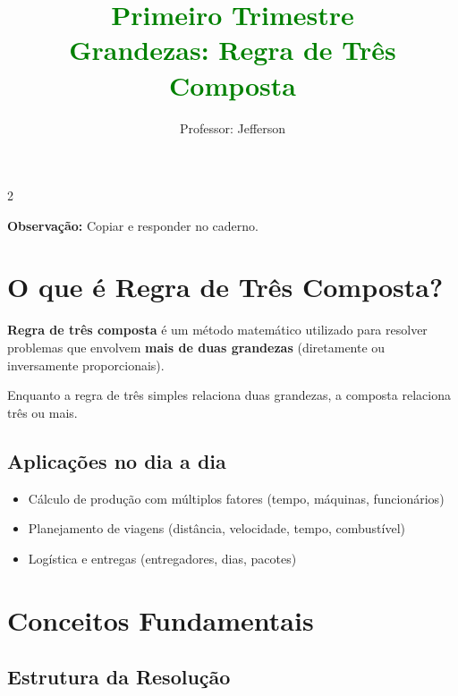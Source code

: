 \documentclass[11pt]{article}
\title{\textcolor{green}{Primeiro Trimestre \\
    Grandezas: Regra de Três Composta}}
\author{Professor: Jefferson}
\date{}
\begin{document}
\maketitle
\vspace{-1cm}

\begin{multicols}{2}
\begin{center}
    \textbf{Observação:} Copiar e responder no caderno.
\end{center}
    
\section*{O que é Regra de Três Composta?}

\textbf{Regra de três composta} é um método matemático utilizado para resolver problemas que envolvem \textbf{mais de duas grandezas} (diretamente ou inversamente proporcionais).

Enquanto a regra de três simples relaciona duas grandezas, a composta relaciona três ou mais.

\subsection*{Aplicações no dia a dia}
\begin{itemize}
    \item Cálculo de produção com múltiplos fatores (tempo, máquinas, funcionários)
    \item Planejamento de viagens (distância, velocidade, tempo, combustível)
    \item Logística e entregas (entregadores, dias, pacotes)
\end{itemize}

\section*{Conceitos Fundamentais}

\subsection*{Estrutura da Resolução}



\end{multicols}
\end{document}
